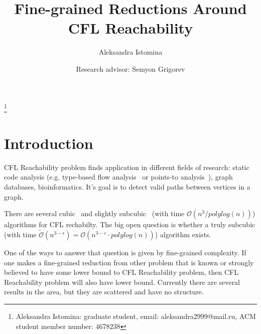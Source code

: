 \documentclass[acmsmall,review,nonacm]{acmart}\settopmatter{printfolios=true,printccs=false,printacmref=false}
\begin{document}
	
	\title{Fine-grained Reductions Around CFL Reachability}
	
	\author{Aleksandra Istomina}
	\thanks{Aleksandra Istomina: graduate student, email: aleksandra2999@mail.ru, ACM student member number: 4678238}

    \author{Research advisor: Semyon Grigorev}
	
	\newcommand\todo[1]{{\color{violet}#1}}
	\newcommand\db[1]{{\color{red}#1}}
	\newcommand\question[1]{{\color{cyan}#1}}


	\maketitle
	
	\section{Introduction}
	
	CFL Reachability problem finds application in different fields of research: static code analysis (e.g. type-based flow analysis~\cite{10.1145/373243.360208} or points-to analysis~\cite{10.1145/1103845.1094817, 10.1145/1133255.1134027}), graph databases, bioinformatics. It's goal is to detect valid paths between vertices in a graph. 
	
	There are several cubic~\cite{10.1145/298514.298576, 10.1145/199448.199462} and slightly subcubic~\cite{10.1145/1328438.1328460} (with time $\mathcal{O}(n^{3} / polylog(n))$) algorithms for CFL rechabilty. The big open question is whether a truly subcubic (with time $\tilde{\mathcal{O}}(n^{3 - \epsilon}) = \mathcal{O}(n^{3 - \epsilon} \cdot polylog(n))$) algorithm exists. 
	
	One of the ways to answer that question is given by fine-grained complexity. If one makes a fine-grained reduction from other problem that is known or strongly believed to have some lower bound to CFL Reachability problem, then CFL Reachability problem will also have lower bound. Currently there are several results in the area, but they are scattered and have no structure.
	
\end{document}

